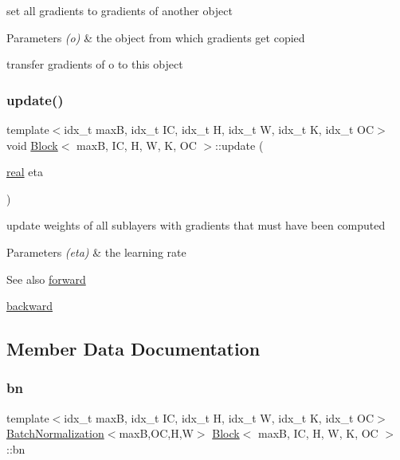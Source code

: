 set all gradients to gradients of another object 


\begin{DoxyParams}{Parameters}
{\em (o)} & the object from which gradients get copied\\
\hline
\end{DoxyParams}
transfer gradients of o to this object \mbox{\label{structBlock_a3d431dfca3c47701c1c41e471ea17c8b}} 
\subsubsection{\texorpdfstring{update()}{update()}}
{\footnotesize\ttfamily template$<$idx\+\_\+t maxB, idx\+\_\+t IC, idx\+\_\+t H, idx\+\_\+t W, idx\+\_\+t K, idx\+\_\+t OC$>$ \\
void \hyperlink{structBlock}{Block}$<$ maxB, IC, H, W, K, OC $>$\+::update (\begin{DoxyParamCaption}\item[{\hyperlink{vgg__util_8h_a1082d08aaa761215ec83e7149f27ad16}{real}}]{eta }\end{DoxyParamCaption})\hspace{0.3cm}{\ttfamily [inline]}}



update weights of all sublayers with gradients that must have been computed 


\begin{DoxyParams}{Parameters}
{\em (eta)} & the learning rate \\
\hline
\end{DoxyParams}
\begin{DoxySeeAlso}{See also}
\hyperlink{structBlock_a6a6ee3389b0ea5618109c9ca525ba9bf}{forward} 

\hyperlink{structBlock_a86b4cafe64fbb5d045b7f2bc401d9ddc}{backward} 
\end{DoxySeeAlso}


\subsection{Member Data Documentation}
\mbox{\label{structBlock_afedad10fac693a934c1d72e24d478b6b}} 
\subsubsection{\texorpdfstring{bn}{bn}}
{\footnotesize\ttfamily template$<$idx\+\_\+t maxB, idx\+\_\+t IC, idx\+\_\+t H, idx\+\_\+t W, idx\+\_\+t K, idx\+\_\+t OC$>$ \\
\hyperlink{structBatchNormalization}{Batch\+Normalization}$<$maxB,OC,H,W$>$ \hyperlink{structBlock}{Block}$<$ maxB, IC, H, W, K, OC $>$\+::bn}

